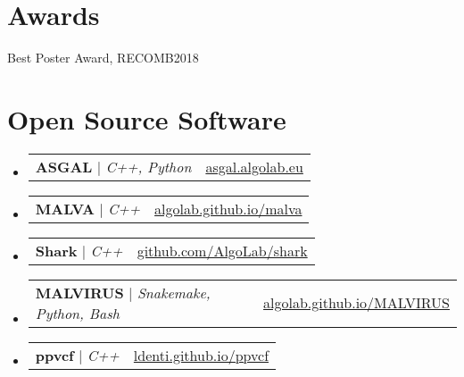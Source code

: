 \documentclass[letterpaper,11pt]{article}
\makeatletter
\newcommand{\resumeProjectHeading}[2]{
    \item
    \begin{tabular*}{0.97\textwidth}{l@{\extracolsep{\fill}}r}
      \small#1 & #2 \\
    \end{tabular*}\vspace{-7pt}
}
\newcommand{\resumeSubHeadingListStart}{\begin{itemize}[leftmargin=0.15in, label={}]}
\newcommand{\resumeSubHeadingListEnd}{\end{itemize}}
\makeatother
\begin{document}
\section{Awards}
 \begin{itemize}
    \small{
        \item Best Poster Award, RECOMB2018
    }
 \end{itemize}
 
\section{Open Source Software}
    \resumeSubHeadingListStart
      \resumeProjectHeading {\textbf{ASGAL} $|$ \emph{C++, Python}}{\href{https://asgal.algolab.eu/}{asgal.algolab.eu}}
      \resumeProjectHeading {\textbf{MALVA} $|$ \emph{C++}}{\href{https://algolab.github.io/malva/}{algolab.github.io/malva}}
      \resumeProjectHeading {\textbf{Shark} $|$ \emph{C++}}{\href{https://github.com/AlgoLab/shark}{github.com/AlgoLab/shark}}
      \resumeProjectHeading {\textbf{MALVIRUS} $|$ \emph{Snakemake, Python, Bash}}{\href{https://algolab.github.io/MALVIRUS/}{algolab.github.io/MALVIRUS}}
      \resumeProjectHeading {\textbf{ppvcf} $|$ \emph{C++}}{\href{https://ldenti.github.io/ppvcf/}{ldenti.github.io/ppvcf}}
    \resumeSubHeadingListEnd
\end{document}
